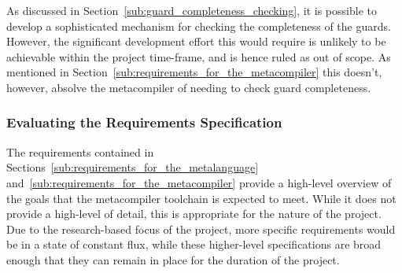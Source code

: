 As discussed in Section~\ref{sub:guard_completeness_checking}, it is possible to develop a sophisticated mechanism for checking the completeness of the guards.
However, the significant development effort this would require is unlikely to be achievable within the project time-frame, and is hence ruled as out of scope. 
As mentioned in Section~\ref{sub:requirements_for_the_metacompiler} this doesn't, however, absolve the metacompiler of needing to check guard completeness. 


\subsubsection{Evaluating the Requirements Specification} %
\label{ssub:evaluating_the_requirements_specification}
The requirements contained in Sections~\ref{sub:requirements_for_the_metalanguage} and~\ref{sub:requirements_for_the_metacompiler} provide a high-level overview of the goals that the metacompiler toolchain is expected to meet. 
While it does not provide a high-level of detail, this is appropriate for the nature of the project.\\

Due to the research-based focus of the project, more specific requirements would be in a state of constant flux, while these higher-level specifications are broad enough that they can remain in place for the duration of the project.



